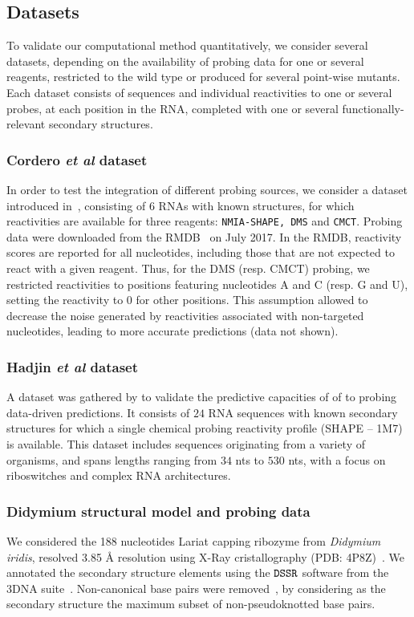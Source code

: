 \documentclass[a4,center,fleqn]{NAR}
\newcommand{\Software}[1]{$\text{\ttfamily #1}$}
\newcommand{\SH }{{\tt SHAPE}\xspace}
\begin{document}
\subsection{Datasets} 
\label{sec:datasets}
To validate our computational method quantitatively, we consider several datasets, depending on the availability of probing data for one or several reagents, restricted to the wild type or produced for several point-wise mutants. Each dataset consists of sequences and individual reactivities to one or several probes, at each position in the RNA, completed with one or several functionally-relevant secondary structures.


\subsubsection{Cordero \emph{et al} dataset} 

In order to test the integration of different probing sources, we consider a dataset introduced in~\citet{Cordero2012}, consisting of $6$ RNAs with known structures, for which reactivities are available for three reagents: {\tt NMIA-\SH, DMS} and {\tt CMCT}. 
Probing data were downloaded from the RMDB~\citep{Cordero2012a} on July 2017. In the RMDB, reactivity scores are reported for all nucleotides, including those that are not expected to react with a given reagent. Thus, for the DMS (resp. CMCT) probing, we restricted reactivities to positions featuring nucleotides {\sf A} and {\sf C} (resp. {\sf G} and {\sf U}), setting the reactivity to 0 for other positions. This assumption allowed to decrease the noise generated by reactivities associated with non-targeted nucleotides, leading to more accurate predictions (data not shown). 


\subsubsection{Hadjin \emph{et al} dataset} 

A dataset was gathered by \citet{Hajdin2013} to validate the predictive capacities of 
of to probing data-driven predictions. It consists of $24$ RNA sequences with known secondary structures for which a single chemical probing reactivity profile (SHAPE -- 1M7) is available.
This dataset includes sequences originating from a variety of organisms, and spans lengths ranging from $34$ nts to $530$ nts, with a focus on riboswitches and complex RNA architectures. 

\subsubsection{Didymium structural model and probing data} 
We considered the 188 nucleotides Lariat capping ribozyme from {\itshape Didymium iridis}, resolved 3.85 \AA{} resolution using X-Ray cristallography (PDB: 4P8Z)~\citep{Meyer2014}.  We annotated the secondary structure elements using the \Software{DSSR} software from the 3DNA suite~\cite{CitationNeeded}. Non-canonical base pairs were removed~\citep{Smit2008}, by considering as the secondary structure the maximum subset of non-pseudoknotted base pairs.
\end{document}
